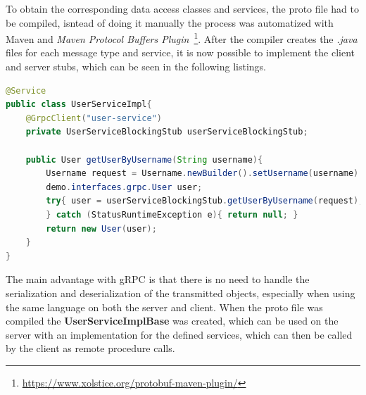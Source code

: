 To obtain the corresponding data access classes and services, the proto file had to be compiled, isntead of doing it manually the process was automatized with Maven and \textit{Maven Protocol Buffers Plugin}~\footnote{\url{https://www.xolstice.org/protobuf-maven-plugin/}}. After the compiler creates the \textit{.java} files for each message type and service, it is now possible to implement the client and server stubs, which can be seen in the following listings.

\begin{lstlisting}[float, language=Java, caption={Java service for GRPC communication}, captionpos=t]
@Service
public class UserServiceImpl{
    @GrpcClient("user-service") 
    private UserServiceBlockingStub userServiceBlockingStub;

    public User getUserByUsername(String username){
        Username request = Username.newBuilder().setUsername(username).build();
        demo.interfaces.grpc.User user;
        try{ user = userServiceBlockingStub.getUserByUsername(request);
        } catch (StatusRuntimeException e){ return null; }
        return new User(user);
    }
}
\end{lstlisting}

The main advantage with gRPC is that there is no need to handle the serialization and deserialization of the transmitted objects, especially when using the same language on both the server and client. When the proto file was compiled the \textbf{UserServiceImplBase} was created, which can be used on the server with an implementation for the defined services, which can then be called by the client as remote procedure calls.

